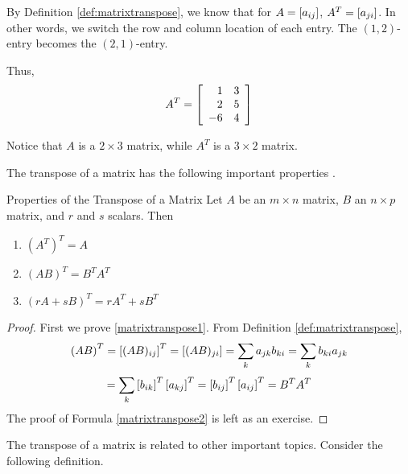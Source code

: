 \begin{solution}
By Definition \ref{def:matrixtranspose}, we know that for $A = \left[ a_{ij} \right]$, 
$A^T = \left[ a_{ji} \right]$. In other words, we switch the row and column
location of each entry. The $\left( 1, 2 \right)$-entry becomes the $\left( 2,1 \right)$-entry.

Thus, 
\begin{equation*}
A^T = 
 \left[
\begin{array}{rr}
1 & 3 \\
2 & 5 \\
-6 & 4
\end{array}
\right] 
\end{equation*}

Notice that $A$ is a $2 \times 3$ matrix, while $A^T$ is a $3 \times 2$ matrix. 
\end{solution}

The transpose of a matrix has the following important properties .

\begin{lemma}{Properties of the Transpose of a Matrix}\label{lem:transposeproperties}
Let $A$ be an $m\times n$ matrix, $B$ an $n\times p$ matrix, and $r$ and $s$ scalars. Then
\begin{enumerate}
\item
$\left(A^{T}\right)^{T} = A$
\item
$\left( AB\right) ^{T}=B^{T}A^{T} $ \label{matrixtranspose1}
\item
$\left( rA+ sB\right) ^{T}=rA^{T}+ sB^{T}$  \label{matrixtranspose2}
\end{enumerate}
\end{lemma}

\ifdefined\showproofs
\begin{proof}
First we prove \ref{matrixtranspose1}. From Definition \ref{def:matrixtranspose},
\begin{equation*}
\left(AB\right)^{T} = \left[ (AB) _{ij} \right] ^{T}=\left[ (AB)_{ji} \right]=\sum_{k}a_{jk}b_{ki}= \sum_{k}b_{ki}a_{jk} 
\end{equation*}
\begin{equation*}
= \sum_{k}\left[ b_{ik}\right]^{T}\left[
a_{kj}\right]^{T}=\left[ b_{ij}\right] ^{T} \left[ a_{ij}\right]^{T} = B^{T}A^{T} 
\end{equation*}
The proof of Formula \ref{matrixtranspose2} is left as an exercise. 
\end{proof}
\fi
The transpose of a matrix is related to other important topics. Consider the following definition.  

